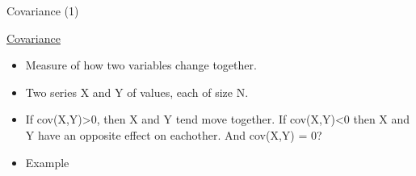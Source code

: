 \documentclass[compress]{beamer}
\providecommand{\tightlist}{%
  \setlength{\itemsep}{0pt}\setlength{\parskip}{0pt}}
\begin{document}
\begin{frame}{Covariance (1)}

\href{http://en.wikipedia.org/wiki/Covariance}{Covariance}

\begin{itemize}
\tightlist
\item
  Measure of how two variables change together.
\item
  Two series X and Y of values, each of size N.
\item
  If cov(X,Y)\textgreater{}0, then X and Y tend move together. If
  cov(X,Y)\textless{}0 then X and Y have an opposite effect on
  eachother. And cov(X,Y) = 0?
\item
  Example
\end{itemize}

\end{frame}
\end{document}
